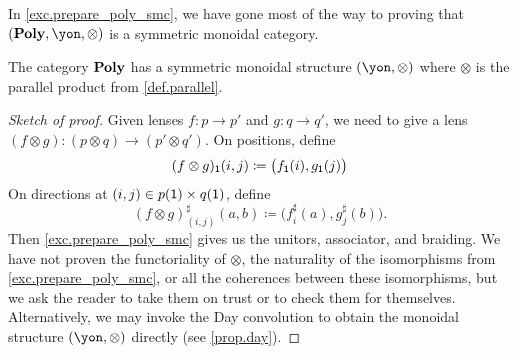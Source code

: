 \documentclass[Book-Poly]{subfiles}
\begin{document}
In \cref{exc.prepare_poly_smc}, we have gone most of the way to proving that $(\poly,\yon,\otimes)$ is a symmetric monoidal category.

\begin{proposition}\label{prop.parallel_monoidal}
The category $\mathbf{Poly}$ has a symmetric monoidal structure $(\yon,\otimes)$ where $\otimes$ is the parallel product from \cref{def.parallel}.
\end{proposition}
\begin{proof}[Sketch of proof]
Given lenses $f\colon p\to p'$ and $g\colon q\to q'$, we need to give a lens $(f\otimes g)\colon (p\otimes q)\to (p'\otimes q')$. On positions, define
\[
(f\otimes g)_{\textsf{1}}(i,j)\coloneqq \big(f_{\textsf{1}}(i),g_{\textsf{1}}(j)\big)
\]
On directions at $(i,j)\in p(\textsf{1})\times q(\textsf{1})$, define
\[
  (f\otimes g)^\sharp_{(i,j)}(a,b)\coloneqq
  \big(f^\sharp_i(a),g^\sharp_j(b)\big).
\]
Then \cref{exc.prepare_poly_smc} gives us the unitors, associator, and braiding.
We have not proven the functoriality of $\otimes$, the naturality of the isomorphisms from \cref{exc.prepare_poly_smc}, or all the coherences between these isomorphisms, but we ask the reader to take them on trust or to check them for themselves.
Alternatively, we may invoke the Day convolution to obtain the monoidal structure $(\yon, \otimes)$ directly (see \cref{prop.day}).
\end{proof}
\end{document}

